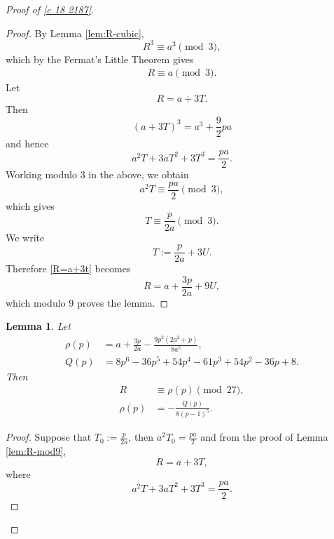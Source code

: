 \documentclass[12pt]{article}
\numberwithin{equation}{section}
\theoremstyle{plain}
\numberwithin{theorem}{section}
\newtheorem{lemma}[theorem]{Lemma}
\theoremstyle{definition}
\theoremstyle{remark}
\begin{document}
\begin{proof}[Proof of \eqref{c 18 2187}]
\begin{proof}
By Lemma \ref{lem:R-cubic},
\begin{equation*}
R^3\equiv a^3\pmod3,
\end{equation*}
which by the Fermat's Little Theorem \cite[Page 88]{burton2010ebook} gives
\begin{align*}
    R\equiv a\pmod3.
\end{align*}
Let
\begin{equation}
R=a+3T.\label{R=a+3t}
\end{equation}
Then
\begin{equation*}
(a+3T)^3=a^3+\frac92pa
\end{equation*}
and hence
\begin{equation*}
a^2T+3aT^2+3T^3
=
\frac{pa}{2}.
\end{equation*}
Working modulo $3$ in the above, we obtain
\begin{equation*}
a^2T\equiv\frac{pa}{2}\pmod3,
\end{equation*}
which gives
\begin{equation*}
T\equiv\frac{p}{2a}\pmod3.
\end{equation*}
We write
\begin{equation*}
T:=\frac{p}{2a}+3U.
\end{equation*}
Therefore \eqref{R=a+3t} becomes
\begin{equation*}
R=a+\frac{3p}{2a}+9U,
\end{equation*}
which modulo 9 proves the lemma.
\end{proof}


\begin{lemma}\label{lem:R-mod27}
Let
\begin{align*}
\rho(p)
&=
a+\frac{3p}{2a}
-\frac{9p^2(2a^2+p)}{8a^5},\\
Q(p)
&=
8p^6-36p^5+54p^4-61p^3
+54p^2-36p+8.
\end{align*}
Then
\begin{align*}
R&\equiv\rho(p)\pmod{27},\\
\rho(p)
&=
-\frac{Q(p)}{8(p-1)^5}.
\end{align*}
\end{lemma}

\begin{proof}
Suppose that $\displaystyle{T_0:=\frac{p}{2a}}$, then $\displaystyle{a^2T_0=\frac{pa}{2}}$ and from the proof of Lemma \ref{lem:R-mod9},
\iffalse
\begin{equation*}
R=a+3T,
\end{equation*}
where
\begin{equation*}
a^2T+3aT^2+3T^3
=
\frac{pa}{2}.
\end{equation*}


\end{proof}
\end{proof}
\end{document}
